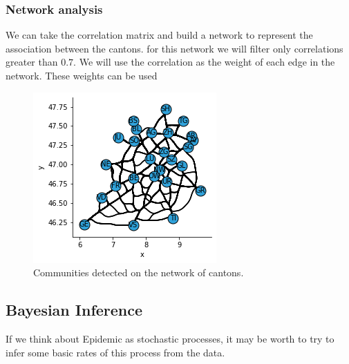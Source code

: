 \documentclass[11pt]{article}
\begin{document}
    

        
    \hypertarget{network-analysis}{%
\subsubsection{Network analysis}\label{network-analysis}}

We can take the correlation matrix and build a network to represent the
association between the cantons. for this network we will filter only
correlations greater than \(0.7\). We will use the correlation as the
weight of each edge in the network. These weights can be used 

    
    
\begin{figure}
 \centering
 \includegraphics[width=\linewidth]{net_communities.png}
 \caption{Communities detected on the network of cantons.}
 \label{fig:network}
\end{figure}
    
 
        
    \hypertarget{bayesian-inference}{%
\subsection{Bayesian Inference}\label{bayesian-inference}}

If we think about Epidemic as stochastic processes, it may be worth to try to infer some basic rates of this process from the data.
\end{document}
